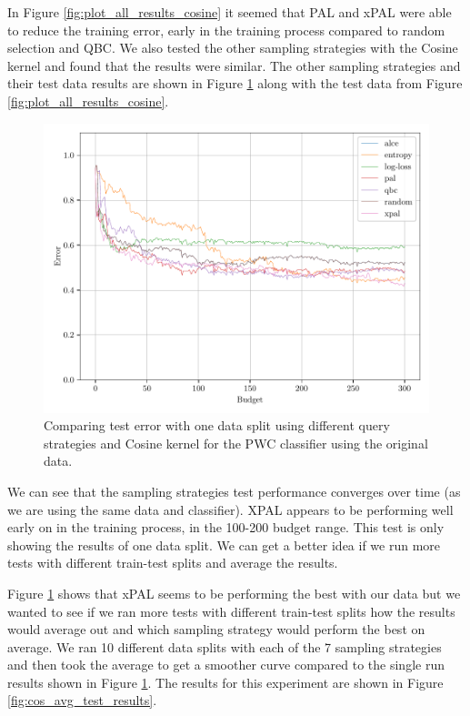 In Figure \ref{fig:plot_all_results_cosine} it seemed that PAL and xPAL were able to reduce the training error, early in the training process compared to random selection and QBC. We also tested the other sampling strategies with the Cosine kernel and found that the results were similar. The other sampling strategies and their test data results are shown in Figure \ref{fig:cos_test_results} along with the test data from Figure \ref{fig:plot_all_results_cosine}. 


\begin{figure}[ht]
    \centering
    \includegraphics[width=\textwidth]{../img/plot_text_data_original_compare_stratagies_test_results}
    \caption{Comparing test error with one data split using different query strategies and Cosine kernel for the PWC classifier using the original data.}
    \label{fig:cos_test_results}
\end{figure}

We can see that the sampling strategies test performance converges over time (as we are using the same data and classifier). XPAL appears to be performing well early on in the training process, in the 100-200 budget range. This test is only showing the results of one data split. We can get a better idea if we run more tests with different train-test splits and average the results.

Figure \ref{fig:cos_test_results} shows that xPAL seems to be performing the best with our data but we wanted to see if we ran more tests with different train-test splits how the results would average out and which sampling strategy would perform the best on average. We ran 10 different data splits with each of the 7 sampling strategies and then took the average to get a smoother curve compared to the single run results shown in Figure \ref{fig:cos_test_results}. The results for this experiment are shown in Figure \ref{fig:cos_avg_test_results}. 

